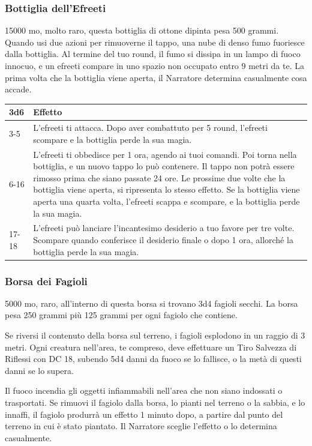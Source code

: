 \begin{multicols}{2}
\subsubsection*{Bottiglia dell'Efreeti}
15000 mo, molto raro, questa bottiglia di ottone dipinta pesa 500 grammi. Quando usi due azioni per rimuoverne il tappo, una nube di denso fumo fuoriesce dalla bottiglia. Al termine del tuo round, il fumo si dissipa in un lampo di fuoco innocuo, e un efreeti compare in uno spazio non occupato entro 9 metri da te. La prima volta che la bottiglia viene aperta, il Narratore determina casualmente cosa accade.

\medskip

\begin{tabularx}{0.45\textwidth}{lX}
\textbf{3d6} &\textbf{Effetto}\\
\hline
3-5 & L'efreeti ti attacca. Dopo aver combattuto per 5 round, l'efreeti scompare e la bottiglia perde la sua magia.\\
6-16 &L'efreeti ti obbedisce per 1 ora, agendo ai tuoi comandi. Poi torna nella bottiglia, e un nuovo tappo lo può contenere. Il tappo non potrà essere rimosso prima che siano passate 24 ore. Le prossime due volte che la bottiglia viene aperta, si ripresenta lo stesso effetto. Se la bottiglia viene aperta una quarta volta, l'efreeti scappa e scompare, e la bottiglia perde la sua magia.\\
17-18 & L'efreeti può lanciare l'incantesimo desiderio a tuo favore per tre volte. Scompare quando conferisce il desiderio finale o dopo 1 ora, allorché la bottiglia perde la sua magia.
\end{tabularx}


\subsubsection*{Borsa dei Fagioli}
5000 mo, raro, all'interno di questa borsa si trovano 3d4 fagioli secchi. La borsa pesa 250 grammi più 125 grammi per ogni fagiolo che contiene.

Se riversi il contenuto della borsa sul terreno, i fagioli esplodono in un raggio di 3 metri. Ogni creatura nell'area, te compreso, deve effettuare un Tiro Salvezza di Riflessi con DC 18, subendo 5d4 danni da fuoco se lo fallisce, o la metà di questi danni se lo supera.

Il fuoco incendia gli oggetti infiammabili nell'area che non siano indossati o trasportati. Se rimuovi il fagiolo dalla borsa, lo pianti nel terreno o la sabbia, e lo innaffi, il fagiolo produrrà un effetto 1 minuto dopo, a partire dal punto del terreno in cui è stato piantato. Il Narratore sceglie l'effetto o lo determina casualmente.

\end{multicols}

